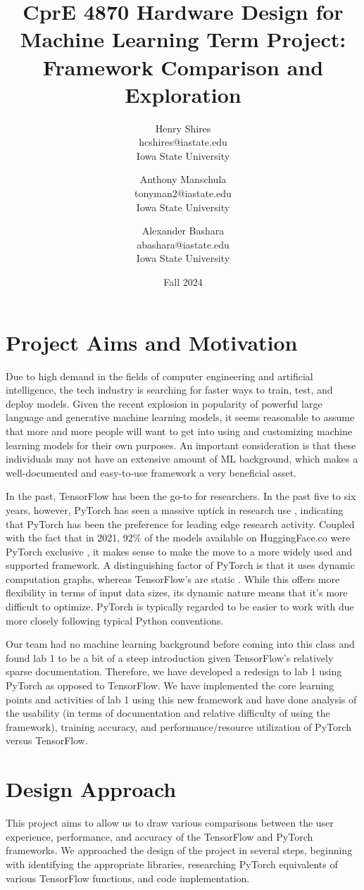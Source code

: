 \documentclass[letterpaper,twocolumn,10pt]{article}
\title{CprE 4870 Hardware Design for Machine Learning Term Project: Framework Comparison and Exploration}
\author{
{\rm Henry Shires}\\
hcshires@iastate.edu\\
Iowa State University
\and
{\rm Anthony Manschula}\\
tonyman2@iastate.edu\\
Iowa State University
\and
{\rm Alexander Bashara}\\
abashara@iastate.edu\\
Iowa State University
}
\date{Fall 2024}
\begin{document}
\maketitle

\section{Project Aims and Motivation}

Due to high demand in the fields of computer engineering and artificial intelligence, the tech industry is searching for faster ways to train, test, and deploy models. Given the recent explosion in popularity of powerful large language and generative machine learning models, it seems reasonable to assume that more and more people will want to get into using and customizing machine learning models for their own purposes. An important consideration is that these individuals may not have an extensive amount of ML background, which makes a well-documented and easy-to-use framework a very beneficial asset.

In the past, TensorFlow has been the go-to for researchers. In the past five to six years, however, PyTorch has seen a massive uptick in research use \cite{oconnor}, indicating that PyTorch has been the preference for leading edge research activity. Coupled with the fact that in 2021, 92\% of the models available on HuggingFace.co were PyTorch exclusive \cite{oconnor}, it makes sense to make the move to a more widely used and supported framework. A distinguishing factor of PyTorch is that it uses dynamic computation graphs, whereas TensorFlow’s are static \cite{boesch}. While this offers more flexibility in terms of input data sizes, its dynamic nature means that it’s more difficult to optimize. PyTorch is typically regarded to be easier to work with due more closely following typical Python conventions.

Our team had no machine learning background before coming into this class and found lab 1 to be a bit of a steep introduction given TensorFlow’s relatively sparse documentation. Therefore, we have developed a redesign to lab 1 using PyTorch as opposed to TensorFlow. We have implemented the core learning points and activities of lab 1 using this new framework and have done analysis of the usability (in terms of documentation and relative difficulty of using the framework), training accuracy, and performance/resource utilization of PyTorch versus TensorFlow.

\section{Design Approach}
This project aims to allow us to draw various comparisons between the user experience, performance, and accuracy of the TensorFlow and PyTorch frameworks. We approached the design of the project in several steps, beginning with identifying the appropriate libraries, researching PyTorch equivalents of various TensorFlow functions, and code implementation. 
\end{document}
